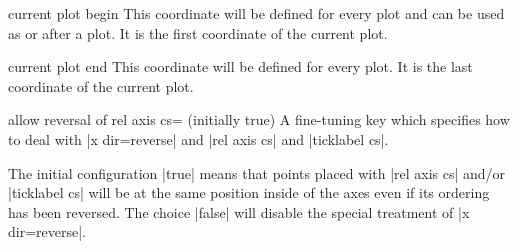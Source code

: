 \begin{predefinednode}{current plot begin}
    This coordinate will be defined for every plot and can be used as
     or after a plot. It is the first coordinate
    of the current plot.
\end{predefinednode}

\begin{predefinednode}{current plot end}
    This coordinate will be defined for every plot. It is the last coordinate
    of the current plot.
\end{predefinednode}

\begin{pgfplotskey}{allow reversal of rel axis cs= (initially true)}
    A fine-tuning key which specifies how to deal with |x dir=reverse| and
    |rel axis cs| and |ticklabel cs|.

    The initial configuration |true| means that points placed with
    |rel axis cs| and/or |ticklabel cs| will be at the same position inside of
    the axes even if its ordering has been reversed. The choice |false| will
    disable the special treatment of |x dir=reverse|.
\end{pgfplotskey}


